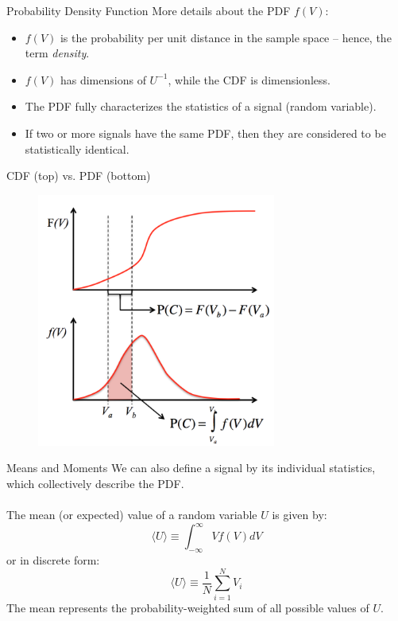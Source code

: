 \begin{frame}{Probability Density Function}
More details about the PDF $f(V)$:
\begin{itemize}
	\item $f(V)$ is the probability per unit distance in the sample space -- hence, the term \textit{density}.
	\item $f(V)$ has dimensions of $U^{-1}$, while the CDF is dimensionless.
	\item The PDF fully characterizes the statistics of a signal (random variable).
	\item If two or more signals have the same PDF, then they are considered to be statistically identical.
	\end{itemize}
\end{frame}


\begin{frame}{CDF (top) vs. PDF (bottom)}
  \begin{figure}[H]
  \centering
  \includegraphics[width=0.7\textwidth]{cdfpdf.png}
  \end{figure}
\end{frame}


\begin{frame}{Means and Moments}
We can also define a signal by its individual statistics, which collectively describe the PDF.
~\\~\\
The mean (or expected) value of a random variable $U$ is given by:
$$\langle U \rangle \equiv \int^{\infty}_{-\infty} Vf(V)dV$$
or in discrete form:
$$\langle U \rangle \equiv \frac{1}{N} \sum^N_{i=1} V_i$$
The mean represents the probability-weighted sum of all possible values of $U$.
\end{frame}

